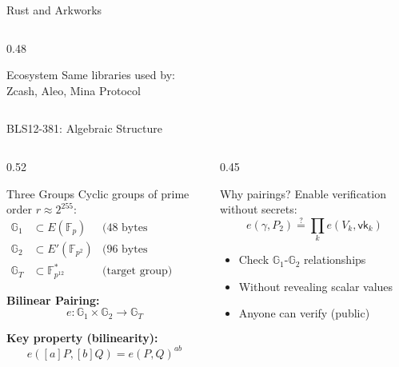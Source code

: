 \documentclass[aspectratio=169,10pt]{beamer}
\newcommand{\G}{\mathbb{G}}
\newcommand{\F}{\mathbb{F}}
\begin{document}
\begin{frame}{Rust and Arkworks}
\begin{columns}[T]
\begin{column}{0.48\textwidth}
            \vspace{0.3em}
            \begin{exampleblock}{Ecosystem}
                Same libraries used by:\\Zcash, Aleo, Mina Protocol
            \end{exampleblock}
        \end{column}
    \end{columns}
\end{frame}

\begin{frame}{BLS12-381: Algebraic Structure}
    \begin{columns}[T]
        \begin{column}{0.52\textwidth}
            \begin{block}{Three Groups}
                Cyclic groups of prime order $r \approx 2^{255}$:
                \begin{align*}
                    \G_1 &\subset E(\F_p) & \text{(48 bytes compressed)}\\
                    \G_2 &\subset E'(\F_{p^2}) & \text{(96 bytes compressed)}\\
                    \G_T &\subset \F_{p^{12}}^* & \text{(target group)}
                \end{align*}
            \end{block}

            \vspace{0.3em}
            \textbf{Bilinear Pairing:}
            \[
            e: \G_1 \times \G_2 \to \G_T
            \]

            \textbf{Key property (bilinearity):}
            \[
            \boxed{e([a]P, [b]Q) = e(P, Q)^{ab}}
            \]
        \end{column}
        \begin{column}{0.45\textwidth}
            \begin{block}{Why pairings?}
                Enable verification without secrets:
                \[
                e(\gamma, P_2) \stackrel{?}{=} \prod_k e(V_k, \mathsf{vk}_k)
                \]

                \begin{itemize}
                    \item Check $\G_1$-$\G_2$ relationships
                    \item Without revealing scalar values
                    \item Anyone can verify (public)
                \end{itemize}
            \end{block}


\end{column}
\end{columns}
\end{frame}
\end{document}
